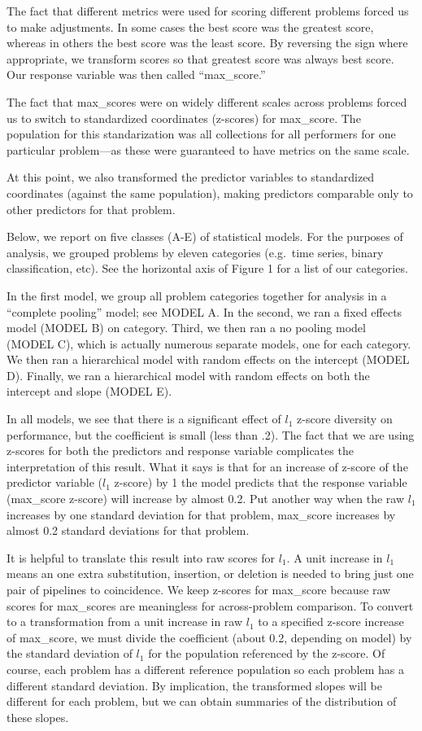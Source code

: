 \documentclass{article}
\begin{document}
The fact that different metrics were used for scoring different
problems forced us to make adjustments.  In some cases the best score
was the greatest score, whereas in others the best score was the least
score.  By reversing the sign where appropriate, we transform scores
so that greatest score was always best score.  Our response variable
was then called ``max\_score.''

The fact that max\_scores were on widely different scales across
problems forced us to switch to standardized coordinates (z-scores)
for max\_score.  The population for this standarization was all
collections for all performers for one particular problem---as these
were guaranteed to have metrics on the same scale.

At this point, we also transformed the predictor variables to
standardized coordinates (against the same population), making
predictors comparable only to other predictors for that problem.

Below, we report on five classes (A-E) of statistical models.  For the
purposes of analysis, we grouped problems by eleven categories
(e.g.\ time series, binary classification, etc).  See the horizontal
axis of Figure 1 for a list of our categories.

In the first model, we group all problem categories together for
analysis in a ``complete pooling'' model; see MODEL A.  In the second,
we ran a fixed effects model (MODEL B) on category.  Third, we then
ran a no pooling model (MODEL C), which is actually numerous separate
models, one for each category.  We then ran a hierarchical model with
random effects on the intercept (MODEL D).  Finally, we ran a
hierarchical model with random effects on both the intercept and slope
(MODEL E).

In all models, we see that there is a significant effect of $l_1$
z-score diversity on performance, but the coefficient is small (less
than .2).  The fact that we are using z-scores for both the predictors
and response variable complicates the interpretation of this result.
What it says is that for an increase of z-score of the predictor
variable ($l_1$ z-score) by 1 the model predicts that the response
variable (max\_score z-score) will increase by almost 0.2.  Put
another way when the raw $l_1$ increases by one standard deviation for
that problem, max\_score increases by almost 0.2 standard deviations
for that problem.

It is helpful to translate this result into raw scores for $l_1$.  A
unit increase in $l_1$ means an one extra substitution, insertion, or
deletion is needed to bring just one pair of pipelines to coincidence.
We keep z-scores for max\_score because raw scores for max\_scores are
meaningless for across-problem comparison.  To convert to a
transformation from a unit increase in raw $l_1$ to a specified
z-score increase of max\_score, we must divide the coefficient (about
0.2, depending on model) by the standard deviation of $l_1$ for the
population referenced by the z-score.  Of course, each problem has a
different reference population so each problem has a different
standard deviation.  By implication, the transformed slopes will be
different for each problem, but we can obtain summaries of the
distribution of these slopes.
\end{document}
